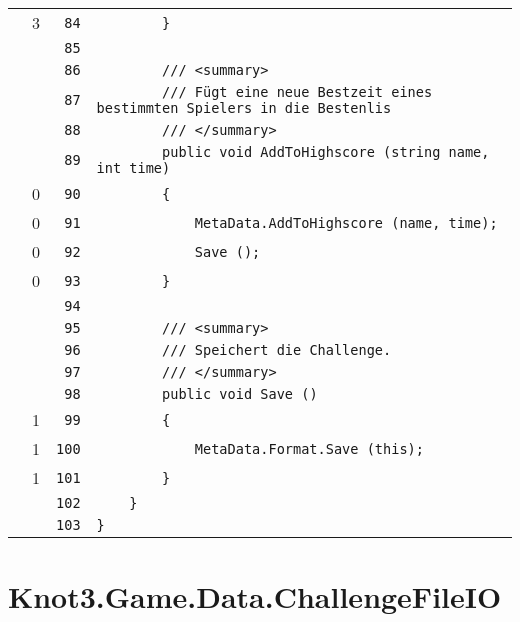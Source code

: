 \documentclass[a4paper,10pt]{article}
\begin{document}
\begin{longtable}[l]{lrrl}
\cellcolor{green} & 3 & \verb~84~ & \verb~        }~\\
\cellcolor{gray} &  & \verb~85~ & \verb~~\\
\cellcolor{gray} &  & \verb~86~ & \verb~        /// <summary>~\\
\cellcolor{gray} &  & \verb~87~ & \verb~        /// Fügt eine neue Bestzeit eines bestimmten Spielers in die Bestenlis~\\
\cellcolor{gray} &  & \verb~88~ & \verb~        /// </summary>~\\
\cellcolor{gray} &  & \verb~89~ & \verb~        public void AddToHighscore (string name, int time)~\\
\cellcolor{red} & 0 & \verb~90~ & \verb~        {~\\
\cellcolor{red} & 0 & \verb~91~ & \verb~            MetaData.AddToHighscore (name, time);~\\
\cellcolor{red} & 0 & \verb~92~ & \verb~            Save ();~\\
\cellcolor{red} & 0 & \verb~93~ & \verb~        }~\\
\cellcolor{gray} &  & \verb~94~ & \verb~~\\
\cellcolor{gray} &  & \verb~95~ & \verb~        /// <summary>~\\
\cellcolor{gray} &  & \verb~96~ & \verb~        /// Speichert die Challenge.~\\
\cellcolor{gray} &  & \verb~97~ & \verb~        /// </summary>~\\
\cellcolor{gray} &  & \verb~98~ & \verb~        public void Save ()~\\
\cellcolor{green} & 1 & \verb~99~ & \verb~        {~\\
\cellcolor{green} & 1 & \verb~100~ & \verb~            MetaData.Format.Save (this);~\\
\cellcolor{green} & 1 & \verb~101~ & \verb~        }~\\
\cellcolor{gray} &  & \verb~102~ & \verb~    }~\\
\cellcolor{gray} &  & \verb~103~ & \verb~}~\\
\end{longtable}
\newpage
\section{Knot3.Game.Data.ChallengeFileIO}
\end{document}
